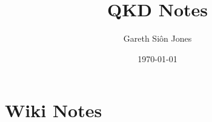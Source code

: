 \documentclass{article}
\title{QKD Notes}
\author{Gareth Siôn Jones }
\date{\today}
\begin{document}
    \maketitle

    \section{Wiki Notes}
\end{document}
